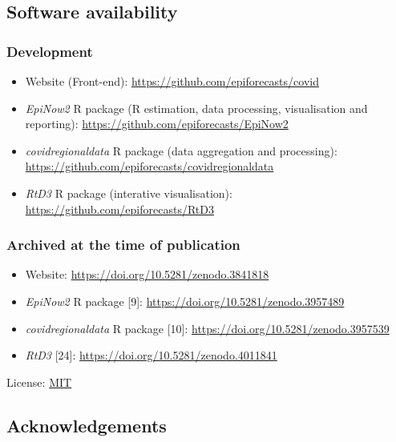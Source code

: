 \documentclass[
]{article}
\providecommand{\tightlist}{%
  \setlength{\itemsep}{0pt}\setlength{\parskip}{0pt}}
\begin{document}
\hypertarget{software-availability}{%
\subsection{Software availability}\label{software-availability}}

\hypertarget{development}{%
\subsubsection{Development}\label{development}}

\begin{itemize}
\tightlist
\item
  Website (Front-end): \url{https://github.com/epiforecasts/covid}
\item
  \emph{EpiNow2} R package (R estimation, data processing, visualisation
  and reporting): \url{https://github.com/epiforecasts/EpiNow2}
\item
  \emph{covidregionaldata} R package (data aggregation and processing):
  \url{https://github.com/epiforecasts/covidregionaldata}
\item
  \emph{RtD3} R package (interative visualisation):
  \url{https://github.com/epiforecasts/RtD3}
\end{itemize}

\hypertarget{archived-at-the-time-of-publication}{%
\subsubsection{Archived at the time of
publication}\label{archived-at-the-time-of-publication}}

\begin{itemize}
\tightlist
\item
  Website: \url{https://doi.org/10.5281/zenodo.3841818}
\item
  \emph{EpiNow2} R package {[}9{]}:
  \url{https://doi.org/10.5281/zenodo.3957489}
\item
  \emph{covidregionaldata} R package {[}10{]}:
  \url{https://doi.org/10.5281/zenodo.3957539}
\item
  \emph{RtD3} {[}24{]}: \url{https://doi.org/10.5281/zenodo.4011841}
\end{itemize}

License: \href{https://opensource.org/licenses/MIT}{MIT}

\hypertarget{acknowledgements}{%
\subsection{Acknowledgements}\label{acknowledgements}}
\end{document}
